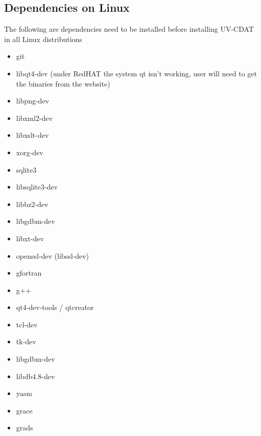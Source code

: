 \documentclass[letterpaper,10pt,english]{sphinxmanual}
\begin{document}
\subsection{Dependencies on Linux}
\label{getting_started:dependencies-on-linux}
The following are dependencies need to be installed before installing UV-CDAT in all   Linux distributions
\begin{itemize}
\item {} 
git

\item {} 
libqt4-dev (under RedHAT the system qt isn't working, user will need to get the binaries from the website)

\item {} 
libpng-dev

\item {} 
libxml2-dev

\item {} 
libxslt-dev

\item {} 
xorg-dev

\item {} 
sqlite3

\item {} 
libsqlite3-dev

\item {} 
libbz2-dev

\item {} 
libgdbm-dev

\item {} 
libxt-dev

\item {} 
openssl-dev (libssl-dev)

\item {} 
gfortran

\item {} 
g++

\item {} 
qt4-dev-tools / qtcreator

\item {} 
tcl-dev

\item {} 
tk-dev

\item {} 
libgdbm-dev

\item {} 
libdb4.8-dev

\item {} 
yasm

\item {} 
grace

\item {} 
grads

\end{itemize}
\end{document}
